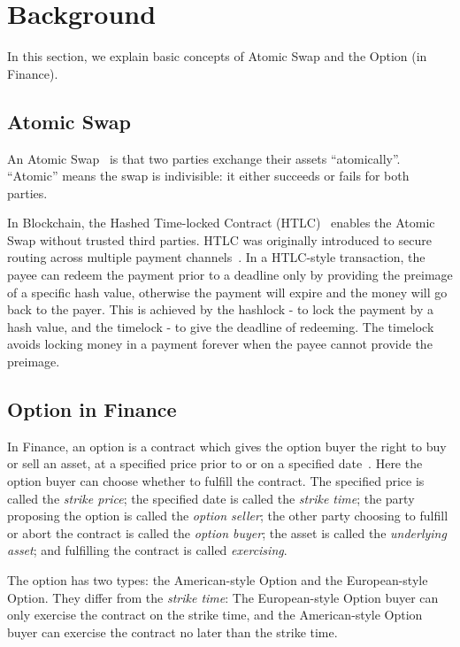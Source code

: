 \section{Background}
\label{sec:background}

In this section, we explain basic concepts of Atomic Swap and the Option (in Finance).

\subsection{Atomic Swap}

An Atomic Swap~\cite{nolan2013alt} is that two parties exchange their assets ``atomically''.
``Atomic'' means the swap is indivisible: it either succeeds or fails for both parties.

In Blockchain, the Hashed Time-locked Contract (HTLC)~\cite{poon2016bitcoin} enables the Atomic Swap without trusted third parties.
HTLC was originally introduced to secure routing across multiple payment channels~\cite{paychannel2018btcwiki}.
In a HTLC-style transaction, the payee can redeem the payment prior to a deadline only by providing the preimage of a specific hash value, otherwise the payment will expire and the money will go back to the payer.
This is achieved by the hashlock - to lock the payment by a hash value, and the timelock - to give the deadline of redeeming.
The timelock avoids locking money in a payment forever when the payee cannot provide the preimage.

\subsection{Option in Finance}
\label{subsec:background_option}

In Finance, an option is a contract which gives the option buyer the right to buy or sell an asset, at a specified price prior to or on a specified date~\cite{higham2004introduction}.
Here the option buyer can choose whether to fulfill the contract.
The specified price is called the \textit{strike price};
the specified date is called the \textit{strike time};
the party proposing the option is called the \textit{option seller};
the other party choosing to fulfill or abort the contract is called the \textit{option buyer};
the asset is called the \textit{underlying asset};
and fulfilling the contract is called \textit{exercising}.

The option has two types: the American-style Option and the European-style Option.
They differ from the \textit{strike time}:
The European-style Option buyer can only exercise the contract on the strike time,
and the American-style Option buyer can exercise the contract no later than the strike time.

